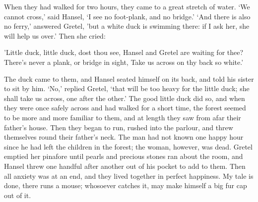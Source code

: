 When they had walked for two hours, they came to a great stretch of water. `We cannot cross,' said Hansel, `I see no foot-plank, and no bridge.' `And there is also no ferry,' answered Gretel, 'but a white
duck is swimming there: if I ask her, she will help us over.' Then she cried:

'Little duck, little duck, dost thou see,
Hansel and Gretel are waiting for thee?
There's never a plank, or bridge in sight,
Take us across on thy back so white.'

The duck came to them, and Hansel seated himself on its back, and told his sister to sit by him. `No,' replied Gretel, `that will be too heavy for the little duck; she shall take us across, one after the other.' The good little duck did so, and when they were once safely across and had walked for a short time, the forest seemed to be more and more familiar to them, and at length they saw from afar their father's house. Then they began to run, rushed into the parlour, and threw themselves round their father's neck. The man had not known one happy hour since he had left the children in the forest; the woman, however, was dead. Gretel emptied her pinafore until pearls and precious stones ran about the room, and Hansel threw one handful after another out of his pocket to add to them. Then all anxiety was at an end, and they lived together in perfect happiness. My tale is done, there runs a mouse; whosoever catches it, may make himself a big fur cap out of it.
